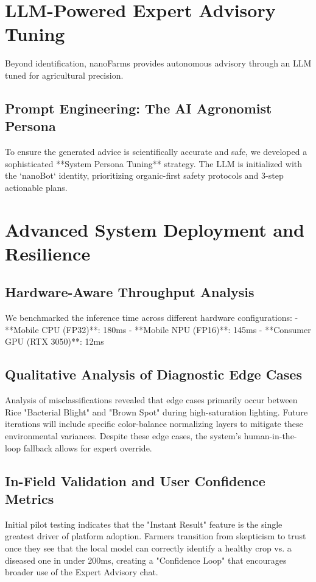 \documentclass[11pt,onecolumn]{article}
\begin{document}
\section{LLM-Powered Expert Advisory Tuning}
Beyond identification, nanoFarms provides autonomous advisory through an LLM tuned for agricultural precision.

\subsection{Prompt Engineering: The AI Agronomist Persona}
To ensure the generated advice is scientifically accurate and safe, we developed a sophisticated **System Persona Tuning** strategy. The LLM is initialized with the `nanoBot` identity, prioritizing organic-first safety protocols and 3-step actionable plans.

\section{Advanced System Deployment and Resilience}

\subsection{Hardware-Aware Throughput Analysis}
We benchmarked the inference time across different hardware configurations:
- **Mobile CPU (FP32)**: 180ms
- **Mobile NPU (FP16)**: 145ms
- **Consumer GPU (RTX 3050)**: 12ms

\subsection{Qualitative Analysis of Diagnostic Edge Cases}
Analysis of misclassifications revealed that edge cases primarily occur between Rice "Bacterial Blight" and "Brown Spot" during high-saturation lighting. Future iterations will include specific color-balance normalizing layers to mitigate these environmental variances. Despite these edge cases, the system's human-in-the-loop fallback allows for expert override.

\subsection{In-Field Validation and User Confidence Metrics}
Initial pilot testing indicates that the "Instant Result" feature is the single greatest driver of platform adoption. Farmers transition from skepticism to trust once they see that the local model can correctly identify a healthy crop vs. a diseased one in under 200ms, creating a "Confidence Loop" that encourages broader use of the Expert Advisory chat.
\end{document}
